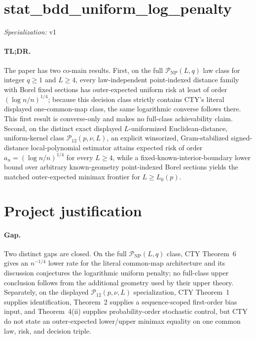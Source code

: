 \documentclass{article}
\begin{document}
\sloppy

\section*{stat\_\allowbreak{}bdd\_\allowbreak{}uniform\_\allowbreak{}log\_\allowbreak{}penalty}

\noindent\textit{Specialization:} v1\par

\paragraph{TL;DR.} The paper has two co-main results.  First, on the full \(\mathcal P_{\mathrm{NP}}(L,q)\) law class for integer \(q\geq1\) and \(L\geq4\), every law-independent point-indexed distance family with Borel fixed sections has outer-expected uniform risk at least of order \((\log n/n)^{1/4}\); because this decision class strictly contains CTY's literal displayed one-common-map class, the same logarithmic converse follows there.  This first result is converse-only and makes no full-class achievability claim.  Second, on the distinct exact displayed \(L\)-uniformized Euclidean-distance, uniform-kernel class \(\mathcal P_{12}(p,\nu,L)\), an explicit winsorized, Gram-stabilized signed-distance local-polynomial estimator attains expected risk of order \(a_n=(\log n/n)^{1/4}\) for every \(L\geq4\), while a fixed-known-interior-boundary lower bound over arbitrary known-geometry point-indexed Borel sections yields the matched outer-expected minimax frontier for \(L\geq L_0(p)\).

\section{Project justification}

\paragraph{Gap.} Two distinct gaps are closed.  On the full \(\mathcal P_{\mathrm{NP}}(L,q)\) class, CTY Theorem~6 gives an \(n^{-1/4}\) lower rate for the literal common-map architecture and its discussion conjectures the logarithmic uniform penalty; no full-class upper conclusion follows from the additional geometry used by their upper theory.  Separately, on the displayed \(\mathcal P_{12}(p,\nu,L)\) specialization, CTY Theorem~1 supplies identification, Theorem~2 supplies a sequence-scoped first-order bias input, and Theorem~4(ii) supplies probability-order stochastic control, but CTY do not state an outer-expected lower/upper minimax equality on one common law, risk, and decision triple.
\end{document}
